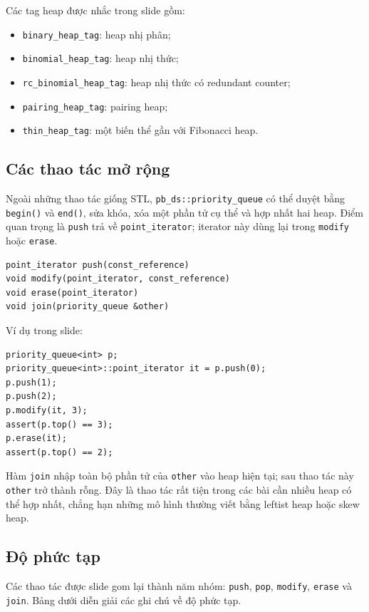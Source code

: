 \documentclass[11pt]{article}
\begin{document}
Các tag heap được nhắc trong slide gồm:
\begin{itemize}
  \item \texttt{binary\_heap\_tag}: heap nhị phân;
  \item \texttt{binomial\_heap\_tag}: heap nhị thức;
  \item \texttt{rc\_binomial\_heap\_tag}: heap nhị thức có redundant counter;
  \item \texttt{pairing\_heap\_tag}: pairing heap;
  \item \texttt{thin\_heap\_tag}: một biến thể gần với Fibonacci heap.
\end{itemize}

\subsection{Các thao tác mở rộng}

Ngoài những thao tác giống STL, \texttt{pb\_ds::priority\_queue} có thể duyệt
bằng \texttt{begin()} và \texttt{end()}, sửa khóa, xóa một phần tử cụ thể và
hợp nhất hai heap. Điểm quan trọng là \texttt{push} trả về
\texttt{point\_iterator}; iterator này dùng lại trong \texttt{modify} hoặc
\texttt{erase}.

\begingroup
\small
\begin{verbatim}
point_iterator push(const_reference)
void modify(point_iterator, const_reference)
void erase(point_iterator)
void join(priority_queue &other)
\end{verbatim}
\endgroup

Ví dụ trong slide:

\begingroup
\small
\begin{verbatim}
priority_queue<int> p;
priority_queue<int>::point_iterator it = p.push(0);
p.push(1);
p.push(2);
p.modify(it, 3);
assert(p.top() == 3);
p.erase(it);
assert(p.top() == 2);
\end{verbatim}
\endgroup

Hàm \texttt{join} nhập toàn bộ phần tử của \texttt{other} vào heap hiện tại;
sau thao tác này \texttt{other} trở thành rỗng. Đây là thao tác rất tiện trong
các bài cần nhiều heap có thể hợp nhất, chẳng hạn những mô hình thường viết
bằng leftist heap hoặc skew heap.

\subsection{Độ phức tạp}

Các thao tác được slide gom lại thành năm nhóm: \texttt{push}, \texttt{pop},
\texttt{modify}, \texttt{erase} và \texttt{join}. Bảng dưới diễn giải các ghi
chú về độ phức tạp.
\end{document}
